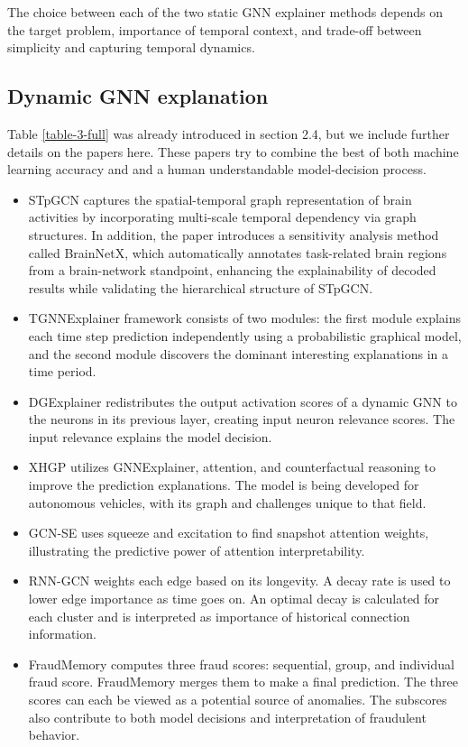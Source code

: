 The choice between each of the two static GNN explainer methods depends on the target problem, importance of temporal context, and trade-off between simplicity and capturing temporal dynamics.

\subsection{Dynamic GNN explanation}
Table \ref{table-3-full} was already introduced in section 2.4, but we include further details on the papers here. These papers try to combine the best of both machine learning accuracy and and a human understandable model-decision process.
\begin{itemize}
    \item STpGCN\cite{ye_explainable_2023} captures the spatial-temporal graph representation of brain activities by incorporating multi-scale temporal dependency via graph structures. In addition, the paper introduces a sensitivity analysis method called BrainNetX, which automatically annotates task-related brain regions from a brain-network standpoint, enhancing the explainability of decoded results while validating the hierarchical structure of STpGCN.
    \item TGNNExplainer\cite{he_explainer_2022} framework consists of two modules: the first module explains each time step prediction independently using a probabilistic graphical model, and the second module discovers the dominant interesting explanations in a time period.
    \item DGExplainer\cite{xie_explaining_2022} redistributes the output activation scores of a dynamic GNN to the neurons in its previous layer, creating input neuron relevance scores. The input relevance explains the model decision.
    \item XHGP\cite{limeros_towards_2022} utilizes GNNExplainer, attention, and counterfactual reasoning to improve the prediction explanations. The model is being developed for autonomous vehicles, with its graph and challenges unique to that field.
    \item GCN-SE\cite{fan_gcn-se_2021} uses squeeze and excitation to find snapshot attention weights, illustrating the predictive power of attention interpretability.
    \item RNN-GCN\cite{yao_interpretable_2021} weights each edge based on its longevity. A decay rate is used to lower edge importance as time goes on. An optimal decay is calculated for each cluster and is interpreted as importance of historical connection information.
    \item FraudMemory\cite{yang_fraudmemory_2019} computes three fraud scores: sequential, group, and individual fraud score. FraudMemory merges them to make a final prediction. The three scores can each be viewed as a  potential source of anomalies. The subscores also contribute to both model decisions and interpretation of fraudulent behavior.
\end{itemize}

